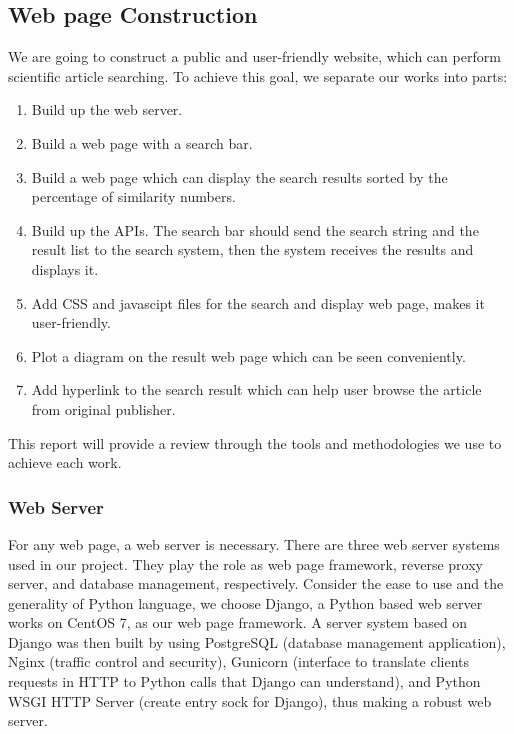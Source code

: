 
\subsection{Web page Construction}

We are going to construct a public and user-friendly website, which can perform scientific article searching.
To achieve this goal, we separate our works into parts:\\
\begin{enumerate}
	\item Build up the web server.	
	\item Build a web page with a search bar.
	\item Build a web page which can display the search results sorted by the percentage of similarity numbers.
	\item Build up the APIs. The search bar should send the search string and the result list to the search system, 
	then the system receives the results and displays it.
	\item Add CSS and javascipt files for the search and display web page, makes it user-friendly.
	\item Plot a diagram on the result web page which can be seen conveniently.
	\item Add hyperlink to the search result which can help user browse the article from original publisher.
\end{enumerate}
This report will provide a review through the tools and methodologies we use to achieve each work.
\subsubsection{Web Server}
For any web page, a web server is necessary.
There are three web server systems used in our project. 
They play the role as web page framework, reverse proxy server, and database management, respectively. 
Consider the ease to use and the generality of Python language, we choose Django, a Python based web server works on CentOS 7, as our web page framework. 
A server system based on Django was then built by using PostgreSQL (database management application), 
Nginx (traffic control and security), Gunicorn (interface to translate clients requests in HTTP to Python calls that Django can understand), and Python WSGI HTTP 
Server (create entry sock for Django), thus making a robust web server.

